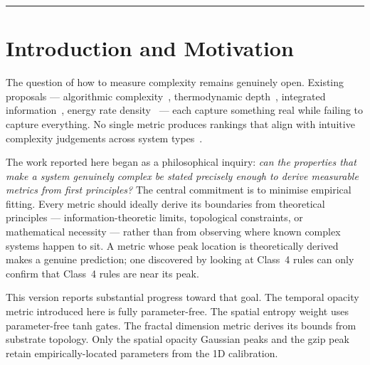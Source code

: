 \documentclass[12pt,a4paper]{article}
\begin{document}
\begin{abstract}
A secondary finding concerns the Seeds rule (B2/S in Conway Life
notation).
Seeds scored highly but carries a Wolfram Class~2 label.
We subsequently confirmed that Seeds was proved Turing-complete on an
infinite periodic grid by Naszvadi~\cite{naszvadi2020}.
The metric's intermediate score is therefore correct: Seeds has
genuine computational richness that a Class~2 label undersells.

We make no strong claims about completeness or correctness and
present these results as a coherent, reproducible programme offered
for expert evaluation.

\bigskip
\noindent\textbf{Keywords:} complexity measures, cellular automata,
edge of chaos, information theory, temporal opacity, fractal
dimension, cross-substrate generalisation, parameter-free metrics
\end{abstract}

\rule{\linewidth}{0.4pt}

\section{Introduction and Motivation}

The question of how to measure complexity remains genuinely open.
Existing proposals --- algorithmic complexity~\cite{kolmogorov1965},
thermodynamic depth~\cite{lloyd1988}, integrated
information~\cite{tononi2004}, energy rate density~\cite{chaisson2001}
--- each capture something real while failing to capture everything.
No single metric produces rankings that align with intuitive complexity
judgements across system types~\cite{gell-mann1996,ladyman2013}.

The work reported here began as a philosophical inquiry: \emph{can
the properties that make a system genuinely complex be stated precisely
enough to derive measurable metrics from first principles?}
The central commitment is to minimise empirical fitting.
Every metric should ideally derive its boundaries from theoretical
principles --- information-theoretic limits, topological constraints,
or mathematical necessity --- rather than from observing where known
complex systems happen to sit.
A metric whose peak location is theoretically derived makes a genuine
prediction; one discovered by looking at Class~4 rules can only confirm
that Class~4 rules are near its peak.

This version reports substantial progress toward that goal.
The temporal opacity metric introduced here is fully parameter-free.
The spatial entropy weight uses parameter-free tanh gates.
The fractal dimension metric derives its bounds from substrate topology.
Only the spatial opacity Gaussian peaks and the gzip peak retain
empirically-located parameters from the 1D calibration.
\end{document}

